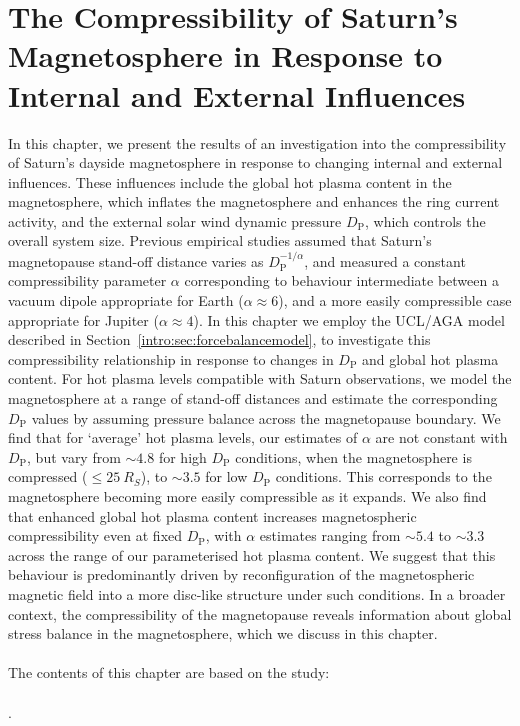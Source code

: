\chapter[The Compressibility of Saturn's Magnetosphere]{The Compressibility of Saturn's Magnetosphere in Response to Internal and External Influences}
\label{chap:compress}

In this chapter, we present the results of an investigation into the compressibility of Saturn's dayside magnetosphere in response to changing internal and external influences. These influences include the global hot plasma content in the magnetosphere, which inflates the magnetosphere and enhances the ring current activity, and the external solar wind dynamic pressure $D_\mathrm{P}$, which controls the overall system size. Previous empirical studies assumed that Saturn's magnetopause stand-off distance varies as $D_\mathrm{P}^{-1/\alpha}$, and measured a constant compressibility parameter $\alpha$ corresponding to behaviour intermediate between a vacuum dipole appropriate for Earth ($\alpha \approx 6$), and a more easily compressible case appropriate for Jupiter ($\alpha \approx 4$). In this chapter we employ the UCL/AGA model described in Section~\ref{intro:sec:forcebalancemodel}, to investigate this compressibility relationship in response to changes in $D_\mathrm{P}$ and global hot plasma content. For hot plasma levels compatible with Saturn observations, we model the magnetosphere at a range of stand-off distances and estimate the corresponding $D_\mathrm{P}$ values by assuming pressure balance across the magnetopause boundary. We find that for `average' hot plasma levels, our estimates of $\alpha$ are not constant with $D_\mathrm{P}$, but vary from ${\sim}4.8$ for high $D_\mathrm{P}$ conditions, when the magnetosphere is compressed (${\leq}\SI{25}{R_S}$), to ${\sim}3.5$ for low $D_\mathrm{P}$ conditions. This corresponds to the magnetosphere becoming more easily compressible as it expands. We also find that enhanced global hot plasma content increases magnetospheric compressibility even at fixed $D_\mathrm{P}$, with $\alpha$ estimates ranging from ${\sim}5.4$ to ${\sim}3.3$ across the range of our parameterised hot plasma content. We suggest that this behaviour is predominantly driven by reconfiguration of the magnetospheric magnetic field into a more disc-like structure under such conditions. In a broader context, the compressibility of the magnetopause reveals information about global stress balance in the magnetosphere, which we discuss in this chapter. \\
\\
The contents of this chapter are based on the study:\\
\\
.

